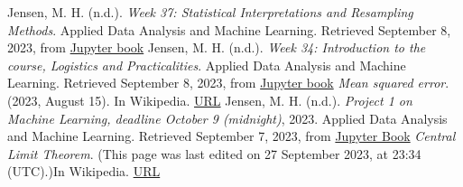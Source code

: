 \documentclass[12pt,
               a4paper,
               article,
               oneside,
               english,oldfontcommands]{memoir}
\begin{document}
\begin{thebibliography}{9}
\vspace{2mm}
Jensen, M. H. (n.d.). \textit{Week 37: Statistical Interpretations and Resampling Methods}. Applied Data Analysis and Machine Learning. Retrieved September 8, 2023, from
\href{https://compphysics.github.io/MachineLearning/doc/LectureNotes/_build/html/week37.html}{Jupyter book}
\vspace{2mm}
Jensen, M. H. (n.d.). \textit{Week 34: Introduction to the course, Logistics and Practicalities}. Applied Data Analysis and Machine Learning. Retrieved September 8, 2023, from \href{https://compphysics.github.io/MachineLearning/doc/LectureNotes/_build/html/week34.html}{Jupyter book}
\vspace{2mm}
\textit{Mean squared error}. (2023, August 15). In Wikipedia. \href{https://en.wikipedia.org/wiki/Mean_squared_error}{URL}
\vspace{2mm}
Jensen, M. H. (n.d.). \textit{Project 1 on Machine Learning, deadline October 9 (midnight)}, 2023. Applied Data Analysis and Machine Learning. Retrieved September 7, 2023, from \href{https://compphysics.github.io/MachineLearning/doc/LectureNotes/_build/html/project1.html#}{Jupyter Book}
\vspace{2mm}
\textit{Central Limit Theorem}. (This page was last edited on 27 September 2023, at 23:34 (UTC).)In Wikipedia. \href{https://en.wikipedia.org/wiki/Central_limit_theorem}{URL}
\end{thebibliography}
\end{document}
